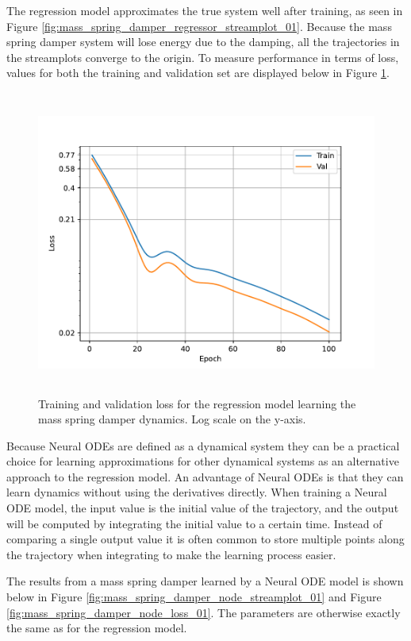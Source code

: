 \documentclass[12pt,a4paper]{book}
\begin{document}
The regression model approximates the true system well after training, as seen in Figure \ref{fig:mass_spring_damper_regressor_streamplot_01}. Because the mass spring damper system will lose energy due to the damping, all the trajectories in the streamplots converge to the origin. To measure performance in terms of loss, values for both the training and validation set are displayed below in Figure \ref{fig:mass_spring_damper_regressor_loss_01}.

\begin{figure}[H]
    \centering
    \includegraphics[height=10cm]{figs/plots/basic_experiments/mass_spring_damper_regressor_loss_01.pdf}
    \caption{Training and validation loss for the regression model learning the mass spring damper dynamics. Log scale on the y-axis.}
    \label{fig:mass_spring_damper_regressor_loss_01}
\end{figure}

Because Neural ODEs are defined as a dynamical system they can be a practical choice for learning approximations for other dynamical systems as an alternative approach to the regression model. An advantage of Neural ODEs is that they can learn dynamics without using the derivatives directly. When training a Neural ODE model, the input value is the initial value of the trajectory, and the output will be computed by integrating the initial value to a certain time. Instead of comparing a single output value it is often common to store multiple points along the trajectory when integrating to make the learning process easier.

The results from a mass spring damper learned by a Neural ODE model is shown below in Figure \ref{fig:mass_spring_damper_node_streamplot_01} and Figure \ref{fig:mass_spring_damper_node_loss_01}. The parameters are otherwise exactly the same as for the regression model.
\end{document}
